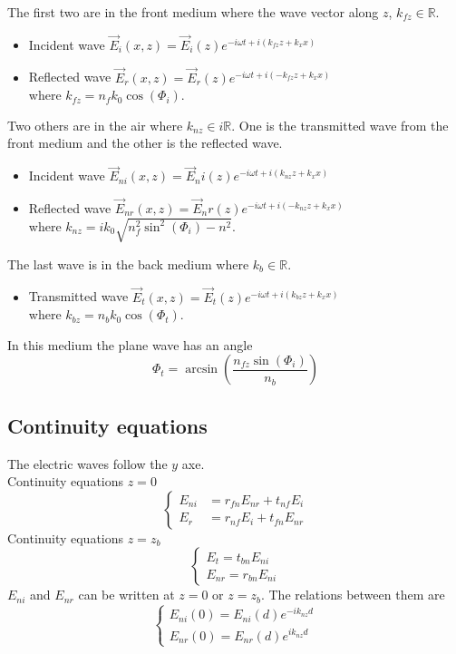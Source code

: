 The first two are in the front medium where the wave vector along $z$, $k_{fz}\in \mathbb{R}$.
\begin{itemize}
\item  Incident wave  $\vec{E}_i(x,z)=\vec{E}_i(z)e^{-i\omega t+i(k_{fz}z+k_xx)}$
\item Reflected wave  $\vec{E}_r(x,z)=\vec{E}_r(z)e^{-i\omega t+i(-k_{fz}z+k_xx)}$\\
where $k_{fz}=n_fk_0\cos(\Phi _i)$.
\end{itemize}
Two others are in the air where $k_{nz}\in i\mathbb{R}$. One is the transmitted wave from the front medium and the other is the reflected wave.
\begin{itemize}
\item Incident wave 
$\vec{E}_{ni}(x,z)=\vec{E}_ni(z)e^{-i\omega t+i(k_{nz}z+k_xx)}$
\item Reflected wave 
$\vec{E}_{nr}(x,z)=\vec{E}_nr(z)e^{-i\omega t+i(-k_{nz}z+k_xx)}$\\
where $k_{nz}=ik_0\sqrt{n_f^2\sin^2(\Phi _i)-n^2}$.
\end{itemize}
The last wave is in the back medium where $k_{b}\in \mathbb{R}$.
\begin{itemize}
\item Transmitted wave
$\vec{E}_t(x,z)=\vec{E}_t(z)e^{-i\omega t+i(k_{bz}z+k_xx)}$\\
where $k_{bz}=n_bk_0\cos(\Phi _t)$.
\end{itemize}
In this medium the plane wave has an angle \\
$$
\Phi_t=\arcsin (\frac{n_{fz}\sin(\Phi_i)}{n_b})
$$

\subsection{Continuity equations} 
The electric waves follow the $y$ axe.\\
Continuity equations $z=0$
\begin{equation}
\left\lbrace
\begin{array}{ccc}\label{eq:continuity0}
E_{ni}&=r_{fn}E_{nr}+t_{nf}E_i\\
E_r&=r_{nf}E_{i}+t_{fn}E_{nr}
\end{array}\right.
\end{equation}
Continuity equations $z=z_b$
\begin{equation}
\left\lbrace
\begin{array}{ccc}\label{eq:continuityd}
E_t=t_{bn}E_{ni}\\
E_{nr}=r_{bn}E_{ni}
\end{array}\right.
\end{equation}
$E_{ni}$ and $E_{nr}$ can be written at $z=0$ or $z=z_b$. The relations between them are
\begin{equation}
\left\lbrace
\begin{array}{ccc}\label{eq:0tod}
E_{ni}(0)=E_{ni}(d)e^{-ik_{nz}d}\\
E_{nr}(0)=E_{nr}(d)e^{ik_{nz}d}
\end{array}\right.
\end{equation}

